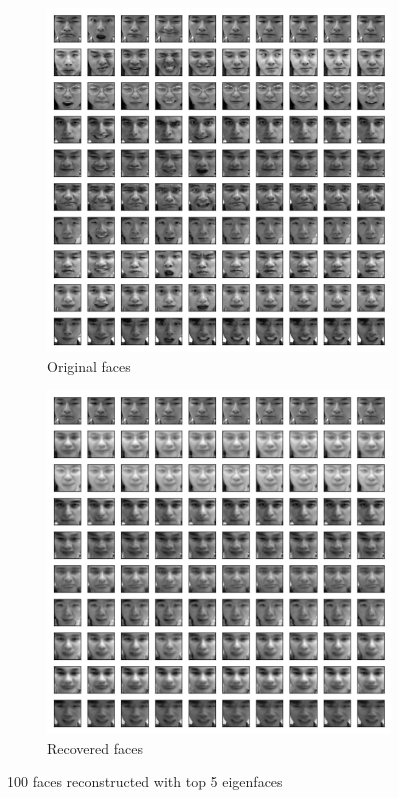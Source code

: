 \documentclass[12pt,a4paper]{extarticle}
\begin{document}
\begin{figure}[ht]
  \begin{subfigure}[t]{0.5\textwidth}
    \centering
    \includegraphics[width=\linewidth]{origin-faces-first-100.png}
    \caption{Original faces}
    \label{fig:original-faces}
  \end{subfigure}
  \begin{subfigure}[t]{0.5\textwidth}
    \centering
    \includegraphics[width=\linewidth]{reconstruct-with-5-eigenfaces.png}
    \caption{Recovered faces}
    \label{fig:recovered-faces}
  \end{subfigure}
  \caption{100 faces reconstructed with top 5 eigenfaces}
  \label{fig:reconstruct-with-eigenfaces}
\end{figure}
\end{document}
